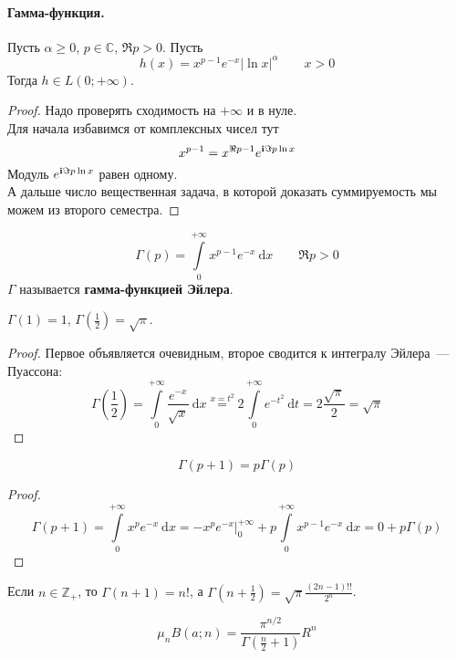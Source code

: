 \documentclass{article}
\begin{document}
    \paragraph{Гамма-функция.}
    \begin{lemma}
        Пусть $\alpha\geqslant0$, $p\in\mathbb C$, $\Re p>0$. Пусть
        $$
        h(x)=x^{p-1}e^{-x}|\ln x|^\alpha\qquad x>0
        $$
        Тогда $h\in L(0;+\infty)$.
    \end{lemma}
    \begin{proof}
        Надо проверять сходимость на $+\infty$ и в нуле.\\
        Для начала избавимся от комплексных чисел тут
        $$
        x^{p-1}=x^{\Re p-1}e^{{\mathbf i}\Im p\ln x}
        $$
        Модуль $e^{{\mathbf i}\Im p\ln x}$ равен одному.\\
        А дальше число вещественная задача, в которой доказать суммируемость мы можем из второго семестра.
    \end{proof}
    \begin{definition}
        $$
        \Gamma(p)=\int\limits_0^{+\infty}x^{p-1}e^{-x}~\mathrm dx\qquad\Re p>0
        $$
        $\Gamma$ называется \textbf{гамма-функцией Эйлера}.
    \end{definition}
    \begin{property}
        $\Gamma(1)=1$, $\Gamma(\frac12)=\sqrt\pi$.
    \end{property}
    \begin{proof}
        Первое объявляется очевидным, второе сводится к интегралу Эйлера~--- Пуассона:
        $$
        \Gamma(\frac12)=\int\limits_0^{+\infty}\frac{e^{-x}}{\sqrt x}~\mathrm dx\overset{x=t^2}=2\int\limits_0^{+\infty}e^{-t^2}~\mathrm dt=2\frac{\sqrt\pi}2=\sqrt\pi
        $$
    \end{proof}
    \begin{property}
        $$\Gamma(p+1)=p\Gamma(p)$$
    \end{property}
    \begin{proof}
        $$
        \Gamma(p+1)=\int\limits_0^{+\infty}x^{p}e^{-x}~\mathrm dx=-x^pe^{-x}\bigg|_{0}^{+\infty}+p\int\limits_0^{+\infty}x^{p-1}e^{-x}~\mathrm dx=0+p\Gamma(p)
        $$
    \end{proof}
    \begin{property}
        Если $n\in\mathbb Z_+$, то $\Gamma(n+1)=n!$, а $\Gamma(n+\frac12)=\sqrt\pi\frac{(2n-1)!!}{2^n}$.
    \end{property}
    \begin{corollary}
        $$
        \mu_nB(a;n)=\frac{\pi^{n/2}}{\Gamma\left(\frac n2+1\right)}R^n
        $$
    \end{corollary}
\end{document}
